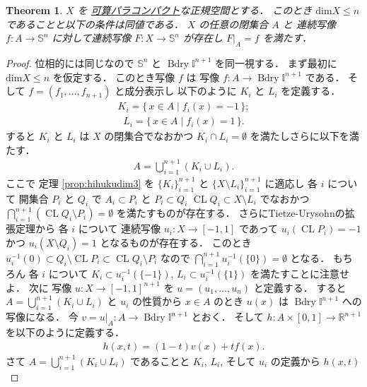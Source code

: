 \documentclass[leqno, a4paper, 12pt]{jsarticle}
\theoremstyle{plain}
\newtheorem{thm}{Theorem}[section]
\theoremstyle{definition}
\theoremstyle{remark}
\newcommand{\rr}{\mathbb{R}}
\DeclareMathOperator{\bd}{\mathrm{Bdry}}
\DeclareMathOperator{\cl}{\mathrm{CL}}
\newcommand{\yodim}{\mathrm{dim}}
\newcommand{\yospfont}[1]{\mathbb{#1}}
\newcommand{\yosphere}[1]{\yospfont{S}^{#1}}
\newcommand{\yocubebd}[1]{\bd\yospfont{I}^{#1}}
\numberwithin{equation}{section}
\begin{document}
\begin{thm}\label{thm:ext:extsphere}
$X$
を
\underline{可算パラコンパクト}な正規空間とする．
このとき
$\yodim X\le n$
であることと以下の条件は同値である．
$X$
の任意の閉集合
$A$
と
連続写像
$f\colon A\to \yosphere{n}$
に対して連続写像
$F\colon X\to \yosphere{n}$
が存在し
$F|_{A}=f$
を満たす．
\end{thm}
\begin{proof}
位相的には同じなので
$\yosphere{n}$
と
$\yocubebd{n+1}$
を同一視する．
まず最初に
$\yodim X\le n$
を仮定する．
このとき写像
$f$
は
写像
$f\colon A\to \yocubebd{n+1}$
である．
そして
$f=(f_{1}, \dots, f_{n+1})$
と成分表示し
以下のように
$K_{i}$
と
$L_{i}$
を定義する．
\begin{align}
K_{i}=\{\, x\in A\mid f_{i}(x)=-1\, \};
\end{align}
\begin{align}
L_{i}=\{\, x\in A\mid f_{i}(x)=1\, \}. 
\end{align}
すると
$K_{i}$
と
$L_{i}$
は
$X$
の閉集合でなおかつ
$K_{i}\cap L_{i}=\emptyset$
を満たしさらに以下を満たす．
\begin{align}
A=\bigcup_{i=1}^{n+1}(K_{i}\cup L_{i}). 
\end{align}
ここで
定理
\ref{prop:hihukudim3}
を
$\{K_{i}\}_{i=1}^{n+1}$
と
$\{X\setminus L_{i}\}_{i=1}^{n+1}$
に適応し
各
$i$
について
開集合
$P_{i}$
と
$Q_{i}$
で
$A_{i}\subset P_{i}$
と
$P_{i}\subset Q_{i}$
$\cl Q_{i}\subset X\setminus L_{i}$
でなおかつ
$\bigcap_{i=1}^{n+1}
(\cl Q_{i}\setminus P_{i})=\emptyset$
を満たすものが存在する．
さらにTietze-Urysohnの拡張定理から
各
$i$
について
連続写像
$u_{i}\colon X\to [-1, 1]$
であって
$u_{i}(\cl P_{i})=-1$
かつ
$u_{i}(X\setminus Q_{i})=1$
となるものが存在する．
このとき
$u_{i}^{-1}(0)\subset Q_{i}\setminus \cl P_{i}\subset \cl Q_{i}\setminus P_{i}$
なので
$\bigcap_{i=1}^{n+1}u_{i}^{-1}(\{0\})=\emptyset$
となる．
もちろん
各
$i$
について
$K_{i}\subset u_{i}^{-1}(\{-1\})$, 
$L_{i}\subset u_{i}^{-1}(\{1\})$
を満たすことに注意せよ．
次に
写像
$u\colon X\to [-1, 1]^{n+1}$
を
$u=(u_{1}, \dots, u_{n})$
と定義する．
すると
$A=\bigcup_{i=1}^{n+1}(K_{i}\cup L_{i})$
と
$u_{i}$
の性質から
$x\in A$
のとき
$u(x)$
は
$\yocubebd{n+1}$
への写像になる．
今
$v=u|_{A}\colon A\to \yocubebd{n+1}$
とおく．
そして
$h\colon A\times  [0, 1]\to \rr^{n+1}$
を以下のように定義する．
\begin{align}
h(x, t)=(1-t)v(x)+tf(x). 
\end{align}
さて
$A=\bigcup_{i=1}^{n+1}(K_{i}\cup L_{i})$
であることと
$K_{i}$, 
$L_{i}$, 
そして
$u_{i}$
の定義から
$h(x, t)$

\end{proof}
\end{document}
